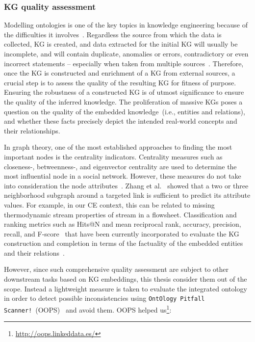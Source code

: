 \subsubsection{KG quality assessment}
Modelling ontologies is one of the key topics in knowledge engineering because of the difficulties it involves~\cite{poveda2014oops}. Regardless the source from which the data is collected, KG is created, and data extracted for the initial KG will usually be incomplete, and will contain duplicate, anomalies or errors, contradictory or even incorrect statements – especially when taken from multiple sources~\cite{hogan2020knowledge}. Therefore, once the KG is constructed and enrichment of a KG from external sources, a crucial step is to assess the quality of the resulting KG for fitness of purpose. Ensuring the robustness of a constructed KG is of utmost significance to ensure the quality of the inferred knowledge. The proliferation of massive KGs poses a question on the quality of the embedded knowledge~(i.e., entities and relations), and whether these facts precisely depict the intended real-world concepts and their relationships.

\hspace*{3.5mm} In graph theory, one of the most established approaches to finding the most important nodes is the centrality indicators. Centrality measures such as closeness-, betweenness-, and eigenvector centrality are used to determine the most influential node in a social network. However, these measures do not take into consideration the node attributes~\cite{zhang2018link}. Zhang et al.~\cite{zhang2018link} showed that a two or three neighborhood subgraph around a targeted link is sufficient to predict its attribute values. For example, in our CE context, this can be related to missing thermodynamic stream properties of stream in a flowsheet.
Classification and ranking metrics such as Hits@N and mean reciprocal rank, accuracy, precision, recall, and F-score~\cite{Morris2019} that have been currently incorporated to evaluate the KG construction and completion in terms of the factuality of the embedded entities and their relations~\cite{karim2019drug}.

\hspace*{3.5mm} However, since such comprehensive quality assessment are subject to other downstream tasks based on KG embeddings, this thesis consider them out of the scope. Instead a lightweight measure is taken to evaluate the integrated ontology in order to detect possible inconsistencies using \texttt{OntOlogy Pitfall Scanner!}~(OOPS)~\cite{poveda2014oops} and avoid them. OOPS helped us\footnote{\url{http://oops.linkeddata.es/}}: 

